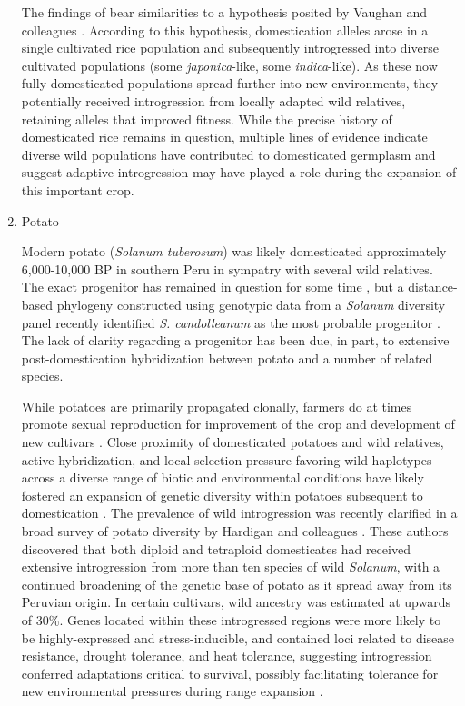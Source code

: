 \documentclass[11pt]{article}
\begin{document}
\begin{enumerate}
The findings of \cite{choi2018multiple} bear similarities to a hypothesis posited by Vaughan and colleagues \cite{vaughan2008evolving}.
According to this hypothesis, domestication alleles arose in a single cultivated rice population and subsequently introgressed into diverse cultivated populations (some \emph{japonica}-like, some \emph{indica}-like).
As these now fully domesticated populations spread further into new environments, they potentially received introgression from locally adapted wild relatives, retaining alleles that improved fitness.
While the precise history of domesticated rice remains in question, multiple lines of evidence indicate diverse wild populations have contributed to domesticated germplasm and suggest adaptive introgression may have played a role during the expansion of this important crop.

\item{Potato}

Modern potato (\emph{Solanum tuberosum}) was likely domesticated approximately 6,000-10,000 BP in southern Peru in sympatry with several wild relatives.
The exact progenitor has remained in question for some time \cite{huaman2002reclassification, spooner2005single, pickersgill1977origins, hawkes1988evolution}, but a distance-based phylogeny constructed using genotypic data from a \emph{Solanum} diversity panel recently identified \emph{S. candolleanum} as the most probable progenitor \cite{hardigan2015taxonomy}.
The lack of clarity regarding a progenitor has been due, in part, to extensive post-domestication hybridization between potato and a number of related species.

While potatoes are primarily propagated clonally, farmers do at times promote sexual reproduction for improvement of the crop and development of new cultivars \cite{quiros1992increase}.
Close proximity of domesticated potatoes and wild relatives, active hybridization, and local selection pressure favoring wild haplotypes across a diverse range of biotic and environmental conditions have likely fostered an expansion of genetic diversity within potatoes subsequent to domestication \cite{brush1995potato}.
The prevalence of wild introgression was recently clarified in a broad survey of potato diversity by Hardigan and colleagues \cite{hardigan2017genome}.
These authors discovered that both diploid and tetraploid domesticates had received extensive introgression from more than ten species of wild \emph{Solanum}, with a continued broadening of the genetic base of potato as it spread away from its Peruvian origin.
In certain cultivars, wild ancestry was estimated at upwards of 30\%.
Genes located within these introgressed regions were more likely to be highly-expressed and stress-inducible, and contained loci related to disease resistance, drought tolerance, and heat tolerance, suggesting introgression conferred adaptations critical to survival, possibly facilitating tolerance for new environmental pressures during range expansion \cite{hardigan2017genome}.
\end{enumerate}
\end{document}
